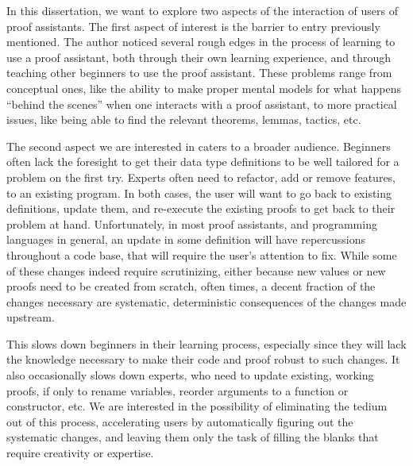 In this dissertation, we want to explore two aspects of the interaction of users
of proof assistants.  The first aspect of interest is the barrier to entry
previously mentioned.  The author noticed several rough edges in the process of
learning to use a proof assistant, both through their own learning experience,
and through teaching other beginners to use the \Coq{} proof assistant.  These
problems range from conceptual ones, like the ability to make proper mental
models for what happens ``behind the scenes'' when one interacts with a proof
assistant, to more practical issues, like being able to find the relevant
theorems, lemmas, tactics, etc.

The second aspect we are interested in caters to a broader audience.  Beginners
often lack the foresight to get their data type definitions to be well tailored
for a problem on the first try.  Experts often need to refactor, add or remove
features, to an existing program.  In both cases, the user will want to go back
to existing definitions, update them, and re-execute the existing proofs to get
back to their problem at hand.  Unfortunately, in most proof assistants, and
programming languages in general, an update in some definition will have
repercussions throughout a code base, that will require the user's attention to
fix.  While some of these changes indeed require scrutinizing, either because
new values or new proofs need to be created from scratch, often times, a decent
fraction of the changes necessary are systematic, deterministic consequences of
the changes made upstream.

This slows down beginners in their learning process, especially since they will
lack the knowledge necessary to make their code and proof robust to such
changes.  It also occasionally slows down experts, who need to update existing,
working proofs, if only to rename variables, reorder arguments to a function or
constructor, etc.  We are interested in the possibility of eliminating the
tedium out of this process, accelerating users by automatically figuring out the
systematic changes, and leaving them only the task of filling the blanks that
require creativity or expertise.

